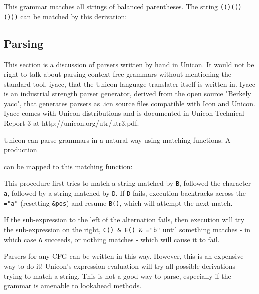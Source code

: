 This grammar matches all strings of balanced parentheses. The string
\texttt{(()(()()))} can be matched by this derivation:


\subsection*{Parsing}

This section is a discussion of parsers written by hand in Unicon.
It would not be right to talk about parsing context free grammars
without mentioning the standard tool, iyacc, that the Unicon language
translater itself is written in.  Iyacc is an industrial strength
parser generator, derived from the open source "Berkely yacc", that
generates parsers as .icn source files compatible with Icon and Unicon.
Iyacc comes with Unicon distributions and is documented in Unicon Technical
Report 3 at http://unicon.org/utr/utr3.pdf. 

Unicon can parse grammars in a natural way using matching
functions. A production


\noindent
can be mapped to this matching function:


\noindent
This procedure first tries to match a string matched by \texttt{B},
followed the character \texttt{a}, followed by a string matched by
\texttt{D}. If \texttt{D} fails, execution
backtracks across the \texttt{="a"}
(resetting \texttt{\&pos}) and resume \texttt{B()}, which will attempt
the next match.

If the sub-expression to the left of the alternation fails, then execution will try the
sub-expression on the right, \texttt{C() \& E() \&
="b"} until something matches - in which
case \texttt{A} succeeds, or nothing matches - which will cause it to
fail.

Parsers for any CFG can be written in this way. However, this is an
expensive way to do it! Unicon's
expression evaluation will try all possible derivations
trying to match a string. This is not a good way to parse, especially
if the grammar is amenable to lookahead methods.


